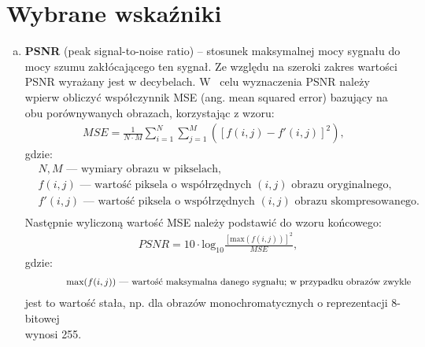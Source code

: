 \documentclass[a4paper, 12pt]{article}
\begin{document}
\section{Wybrane wskaźniki}

\begin{enumerate}[a)]

  \item \textbf {PSNR} (peak signal-to-noise ratio) \--- stosunek maksymalnej mocy sygnału do mocy szumu zakłócającego ten sygnał. 
  Ze względu na szeroki zakres wartości PSNR wyrażany jest w decybelach. 
  W~ celu wyznaczenia PSNR należy wpierw obliczyć współczynnik MSE (ang. mean squared \linebreak error) bazujący na obu porównywanych obrazach, korzystając z wzoru:
  \begin{equation*}
  \begin{aligned}
    MSE =\frac{1}{N \cdot M}\sum_{i=1}^{N}\sum_{j=1}^{M}([f(i,j)-f'(i,j)]^2),
  \end{aligned}
  \end{equation*}
  gdzie:
  \begin{equation*}
  \begin{aligned}
    & N, M \textrm{\ --- wymiary obrazu w pikselach,} \\
    & f(i,j) \textrm{\ --- wartość piksela o współrzędnych } (i,j) \textrm{ obrazu oryginalnego,} \\
    & f'(i,j) \textrm{\ --- wartość piksela o współrzędnych } (i,j) \textrm{ obrazu skompresowanego.} \\
  \end{aligned}
  \end{equation*}
  Następnie wyliczoną wartość MSE należy podstawić do wzoru końcowego: \\
  \begin{equation*}
    \begin{aligned}
      & PSNR = 10 \cdot \mathrm{log_{10}}\frac{[\mathrm{max}(f(i,j))]^2}{MSE},
    \end{aligned}
  \end{equation*}
  gdzie:
  \begin{equation*}
  \begin{aligned}
    & \hspace{1.5cm}\textrm{max}(f(i,j)) \textrm{ --- wartość maksymalna danego sygnału; w przypadku obrazów zwykle}
  \end{aligned}
  \vspace{-0.3cm}
  \end{equation*}
  \hspace{1.55cm} jest to wartość stała, np. dla obrazów monochromatycznych o reprezentacji 8-bitowej \\
  \hspace*{1.5cm} wynosi 255.


\end{enumerate}
\end{document}
